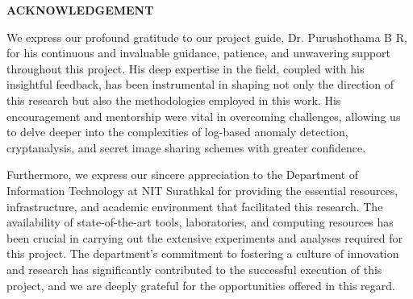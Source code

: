 \begin{center}
	\textbf{{\Large ACKNOWLEDGEMENT}}\\
\end{center}
We express our profound gratitude to our project guide, Dr. Purushothama B R, for his continuous and invaluable guidance, patience, and unwavering support throughout this project. His deep expertise in the field, coupled with his insightful feedback, has been instrumental in shaping not only the direction of this research but also the methodologies employed in this work. His encouragement and mentorship were vital in overcoming challenges, allowing us to delve deeper into the complexities of log-based anomaly detection, cryptanalysis, and secret image sharing schemes with greater confidence.

Furthermore, we express our sincere appreciation to the Department of Information Technology at NIT Surathkal for providing the essential resources, infrastructure, and academic environment that facilitated this research. The availability of state-of-the-art tools, laboratories, and computing resources has been crucial in carrying out the extensive experiments and analyses required for this project. The department's commitment to fostering a culture of innovation and research has significantly contributed to the successful execution of this project, and we are deeply grateful for the opportunities offered in this regard.

\clearpage
